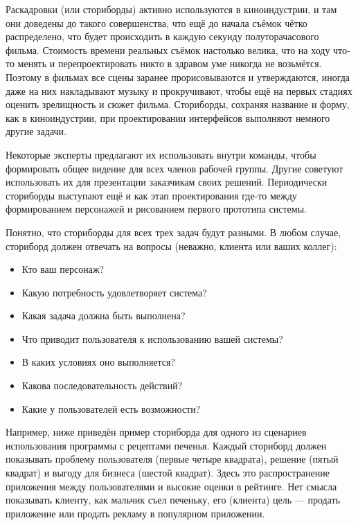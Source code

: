 \documentclass{../../text-style}
\begin{document}
Раскадровки (или сториборды) активно используются в киноиндустрии, и там они доведены до такого совершенства, что ещё до начала съёмок чётко распределено, что будет происходить в каждую секунду полуторачасового фильма. Стоимость времени реальных съёмок настолько велика, что на ходу что-то менять и перепроектировать никто в здравом уме никогда не возьмётся. Поэтому в фильмах все сцены заранее прорисовываются и утверждаются, иногда даже на них накладывают музыку и прокручивают, чтобы ещё на первых стадиях оценить зрелищность и сюжет фильма. Сториборды, сохраняя название и форму, как в киноиндустрии, при проектировании интерфейсов выполняют немного другие задачи.

Некоторые эксперты предлагают их использовать внутри команды, чтобы формировать общее видение для всех членов рабочей группы. Другие советуют использовать их для презентации заказчикам своих решений. Периодически сториборды выступают ещё и как этап проектирования где-то между формированием персонажей и рисованием первого прототипа системы.

Понятно, что сториборды для всех трех задач будут разными. В любом случае, сториборд должен отвечать на вопросы (неважно, клиента или ваших коллег):

\begin{itemize}
    \item Кто ваш персонаж?
    \item Какую потребность удовлетворяет система?
    \item Какая задача должна быть выполнена?
    \item Что приводит пользователя к использованию вашей системы?
    \item В каких условиях оно выполняется?
    \item Какова последовательность действий?
    \item Какие у пользователей есть возможности?
\end{itemize}

Например, ниже приведён пример сториборда для одного из сценариев использования программы с рецептами печенья. Каждый сториборд должен показывать проблему пользователя (первые четыре квадрата), решение (пятый квадрат) и выгоду для бизнеса (шестой квадрат). Здесь это распространение приложения между пользователями и высокие оценки в рейтинге. Нет смысла показывать клиенту, как мальчик съел печеньку, его (клиента) цель --- продать приложение или продать рекламу в популярном приложении.
\end{document}
